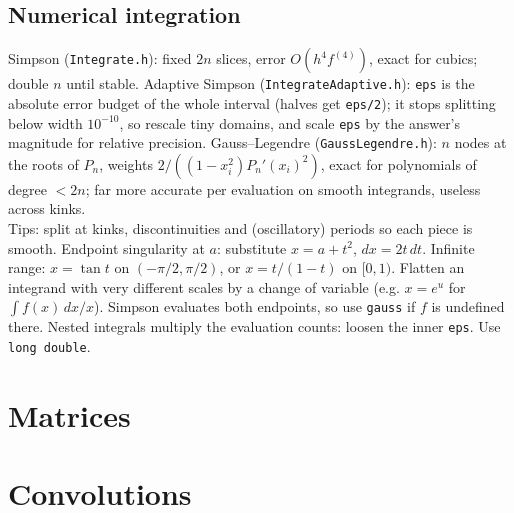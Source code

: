   \subsection{Numerical integration}
	Simpson (\texttt{Integrate.h}): fixed $2n$ slices, error $O(h^4 f^{(4)})$, exact for cubics; double $n$ until stable.
	Adaptive Simpson (\texttt{IntegrateAdaptive.h}): \texttt{eps} is the absolute error budget of the whole interval (halves get \texttt{eps/2}); it stops splitting below width $10^{-10}$, so rescale tiny domains, and scale \texttt{eps} by the answer's magnitude for relative precision.
	Gauss--Legendre (\texttt{GaussLegendre.h}): $n$ nodes at the roots of $P_n$, weights $2/((1-x_i^2)P_n'(x_i)^2)$, exact for polynomials of degree $< 2n$; far more accurate per evaluation on smooth integrands, useless across kinks. \\
	Tips: split at kinks, discontinuities and (oscillatory) periods so each piece is smooth. Endpoint singularity at $a$: substitute $x = a + t^2$, $dx = 2t\,dt$. Infinite range: $x = \tan t$ on $(-\pi/2,\pi/2)$, or $x = t/(1-t)$ on $[0,1)$. Flatten an integrand with very different scales by a change of variable (e.g. $x = e^u$ for $\int f(x)\,dx/x$). Simpson evaluates both endpoints, so use \texttt{gauss} if $f$ is undefined there. Nested integrals multiply the evaluation counts: loosen the inner \texttt{eps}. Use \texttt{long double}.

\section{Matrices}

\section{Convolutions}

